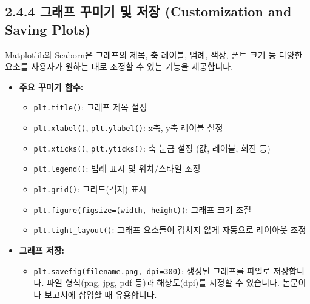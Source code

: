 \documentclass[
  letterpaper,
]{book}
\providecommand{\tightlist}{%
  \setlength{\itemsep}{0pt}\setlength{\parskip}{0pt}}
\begin{document}
\subsection{2.4.4 그래프 꾸미기 및 저장 (Customization and Saving
Plots)}\label{uxadf8uxb798uxd504-uxafb8uxbbf8uxae30-uxbc0f-uxc800uxc7a5-customization-and-saving-plots}

Matplotlib와 Seaborn은 그래프의 제목, 축 레이블, 범례, 색상, 폰트 크기
등 다양한 요소를 사용자가 원하는 대로 조정할 수 있는 기능을 제공합니다.

\begin{itemize}
\tightlist
\item
  \textbf{주요 꾸미기 함수:}

  \begin{itemize}
  \tightlist
  \item
    \texttt{plt.title()}: 그래프 제목 설정
  \item
    \texttt{plt.xlabel()}, \texttt{plt.ylabel()}: x축, y축 레이블 설정
  \item
    \texttt{plt.xticks()}, \texttt{plt.yticks()}: 축 눈금 설정 (값,
    레이블, 회전 등)
  \item
    \texttt{plt.legend()}: 범례 표시 및 위치/스타일 조정
  \item
    \texttt{plt.grid()}: 그리드(격자) 표시
  \item
    \texttt{plt.figure(figsize=(width,\ height))}: 그래프 크기 조절
  \item
    \texttt{plt.tight\_layout()}: 그래프 요소들이 겹치지 않게 자동으로
    레이아웃 조정
  \end{itemize}
\item
  \textbf{그래프 저장:}

  \begin{itemize}
  \tightlist
  \item
    \texttt{plt.savefig(\textquotesingle{}filename.png\textquotesingle{},\ dpi=300)}:
    생성된 그래프를 파일로 저장합니다. 파일 형식(png, jpg, pdf 등)과
    해상도(dpi)를 지정할 수 있습니다. 논문이나 보고서에 삽입할 때
    유용합니다.
  \end{itemize}
\end{itemize}
\end{document}
